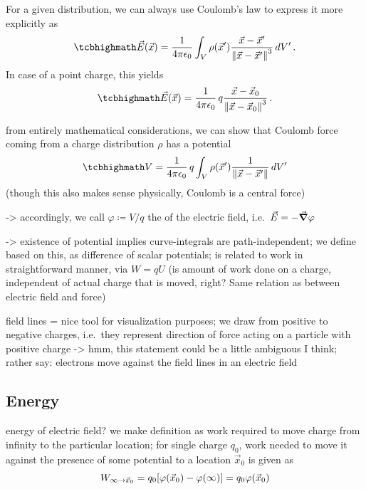 \documentclass[../class_mech_main.tex]{subfiles}
\DeclareMathOperator{\fpeps}{\frac{1}{4 \pi \epsilon_0}}
\begin{document}
For a given distribution, we can always use Coulomb's law to express it more explicitly as
\begin{equation}
    \eqbox{
        \vec{E}(\vec{x}) = \fpeps \int_V \rho(\vec{x}') \frac{\vec{x} - \vec{x}'}{\norm{\vec{x} - \vec{x}'}^3} \, dV'
        } \, .
    \end{equation}
In case of a point charge, this yields
\begin{equation}
    \eqbox{
        \vec{E}(\vec{x}) = \fpeps q \frac{\vec{x} - \vec{x}_0}{\norm{\vec{x} - \vec{x}_0}^3}
    } \, .
\end{equation}



from entirely mathematical considerations, we can show that Coulomb force coming from a charge distribution $\rho$ has a potential
\begin{equation}
    \eqbox{
        V = \fpeps q \int_V \rho(\vec{x}') \frac{1}{\norm{\vec{x} - \vec{x}'}} \, dV'
    }
\end{equation}
(though this also makes sense physically, Coulomb is a central force)

-> accordingly, we call $\varphi \coloneqq V / q$ the  of the electric field, i.e.~$\vec{E} = - \grad \varphi$

-> existence of potential implies curve-integrals are path-independent; we define  based on this, as difference of scalar potentials; is related to work in straightforward manner, via $W = q U$ (is amount of work done on a charge, independent of actual charge that is moved, right? Same relation as between electric field and force)



field lines = nice tool for visualization purposes; we draw from positive to negative charges, i.e.~they represent direction of force acting on a particle with positive charge -> hmm, this statement could be a little ambiguous I think; rather say: electrons move against the field lines in an electric field



        \subsection{Energy}

energy of electric field? we make definition as work required to move charge from infinity to the particular location; for single charge $q_0$, work needed to move it against the presence of some potential to a location $\vec{x}_0$ is given as
\begin{equation}
    W_{\infty \rightarrow \vec{x}_0} = q_0 \qty[\varphi(\vec{x}_0) - \varphi(\infty)] = q_0 \varphi(\vec{x}_0)
\end{equation}
\end{document}

